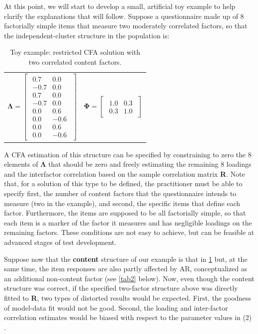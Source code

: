 At this point, we will start to develop a small, artificial toy example to help clarify the explanations that will follow. Suppose a questionnaire made up of 8 factorially simple items that measure two moderately correlated factors, so that the independent-cluster structure in the population is:

\begin{table}[H]
  \centering
  \caption{Toy example: restricted CFA solution with two correlated content factors.}
  \label{tab1}
  \begin{tabular}{ c c }
    $\boldsymbol{\Lambda} =  \begin{bmatrix}  \begin{array}{rr}  0.7 & 0.0 \\ -0.7 & 0.0 \\ 0.7 & 0.0 \\ -0.7 & 0.0 \\  0.0  &  0.6 \\  0.0  & -0.6 \\  0.0  &  0.6 \\  0.0  & -0.6 \end{array}\end{bmatrix}$
    &
    $\boldsymbol{\Phi} = \begin{bmatrix} \begin{array}{rr} 1.0 &  0.3 \\ 0.3 &  1.0 \end{array} \end{bmatrix}$
  \end{tabular}
\end{table}

A CFA estimation of this structure can be specified by constraining to zero the 8 elements of $\boldsymbol{\Lambda}$ that should be zero and freely estimating the remaining 8 loadings and the interfactor correlation based on the sample correlation matrix \textbf{R}. Note that, for a solution of this type to be defined, the practitioner must be able to specify first, the number of content factors that the questionnaire intends to measure (two in the example), and second, the specific items that define each factor.  Furthermore, the items are supposed to be all factorially simple, so that each item is a marker of the factor it measures and has negligible loadings on the remaining factors. These conditions are not easy to achieve, but can be feasible at advanced stages of test development.

Suppose now that the \textbf{content} structure of our example is that in \cref{tab1} but, at the same time, the item responses are also partly affected by AR, conceptualized as an additional non-content factor (see \cref{tab2} below). Now, even though the content structure was correct, if the specified two-factor structure above was directly fitted to \textbf{R}, two types of distorted results would be expected. First, the goodness of model-data fit would not be good. Second, the loading and inter-factor correlation estimates would be biased with respect to the parameter values in (2) \citep[see e.g.][]{DeMars:2014, Ferrando:2010}.

